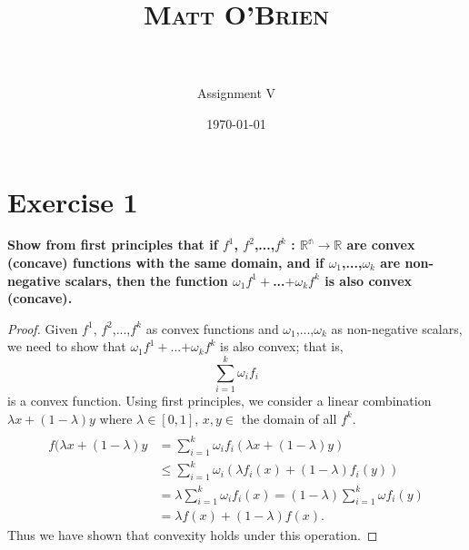 \documentclass[paper=a4, fontsize=11pt]{scrartcl} %
\title{	
\normalfont \normalsize 
\textsc{Matt O'Brien} \\ [25pt] %
\horrule{0.5pt} \\[0.4cm] %
}
\author{Assignment V}
\date{\normalsize\today} %
\begin{document}
\maketitle %
\begin{comment}
\begin{align*}
\int_E (f \cdot \chi A) &= \int_{E/A} (f \cdot \chi A) + \int_A (f \cdot \chi A) \text{ ,by linearity properties of the integral}.
\\  &= 0  + \int_A (f \cdot \chi A) \text{ , by definition of characteristic function}
\\  &=  \int_A (f \cdot \ 1) \text{ , by definition of characteristic function}
\end{align*} 
\end{comment}	

\section*{Exercise 1}
\boldmath
\textbf{Show from first principles that if $f^1$, $f^2$,...,$f^k$ : $\mathbb{R^n} \rightarrow \mathbb{R}$ are convex (concave) functions with the same domain, and if $\omega_1$,...,$\omega_k$ are non-negative scalars, then the function $\omega_1 f^1 +$...$+ \omega_k f^k$ is also convex (concave). }
\unboldmath
\begin{proof}
Given $f^1$, $f^2$,...,$f^k$ as convex functions and $\omega_1$,...,$\omega_k$ as non-negative scalars, we need to show that $\omega_1 f^1 +$...$+ \omega_k f^k$ is also convex; that is, $$\sum_{i = 1}^k \omega_i f_i$$ is a convex function.
\newline
Using first principles, we consider a linear combination $\lambda x + (1 - \lambda)y$ where $\lambda \in [0, 1]$, $x, y \in $ the domain of all $f^k$.
\begin{align*}
\\f (\lambda x + (1 - \lambda)y &= \sum_{i=1}^k \omega_i f_i (\lambda x + (1 - \lambda )y) 
\\ &\leq \sum_{i=1}^k \omega_i (\lambda f_i (x) + (1- \lambda) f_i(y)) 
\\ &= \lambda \sum_{i =1}^k \omega_i f_i(x) = (1 - \lambda) \sum_{i =1}^k \omega f_i(y)
\\ &= \lambda f(x) + (1 - \lambda) f(x).
\end{align*}
Thus we have shown that convexity holds under this operation.
\end{proof}
\end{document}

